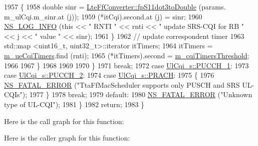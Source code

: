 \begin{DoxyCode}
1957               \{
1958                 \textcolor{keywordtype}{double} sinr = \hyperlink{classns3_1_1LteFfConverter_aa5d8c2a8f988dbd63da91818c18666eb}{LteFfConverter::fpS11dot3toDouble} (params.
      m\_ulCqi.m\_sinr.at (j));
1959                 (*itCqi).second.at (j) = sinr;
1960                 \hyperlink{group__logging_gafbd73ee2cf9f26b319f49086d8e860fb}{NS\_LOG\_INFO} (\textcolor{keyword}{this} << \textcolor{stringliteral}{" RNTI "} << rnti << \textcolor{stringliteral}{" update SRS-CQI for RB  "} << j << \textcolor{stringliteral}{"
       value "} << sinr);
1961               \}
1962             \textcolor{comment}{// update correspondent timer}
1963             std::map <uint16\_t, uint32\_t>::iterator itTimers;
1964             itTimers = \hyperlink{classns3_1_1TtaFfMacScheduler_adb17b15e869d53e4244bf77f3f842f67}{m\_ueCqiTimers}.find (rnti);
1965             (*itTimers).second = \hyperlink{classns3_1_1TtaFfMacScheduler_a3dd8aa322782db3d0f2bbaf9fede6fca}{m\_cqiTimersThreshold};
1966 
1967           \}
1968 
1969 
1970       \}
1971       \textcolor{keywordflow}{break};
1972     \textcolor{keywordflow}{case} \hyperlink{structns3_1_1UlCqi__s_aece9e5ebea42eb9ff1744c72c8459b57a05ca6554bc6fcd96a0a51fbaa8e794c7}{UlCqi\_s::PUCCH\_1}:
1973     \textcolor{keywordflow}{case} \hyperlink{structns3_1_1UlCqi__s_aece9e5ebea42eb9ff1744c72c8459b57a35664b4bda6f1cd6acfe9edc84c7571d}{UlCqi\_s::PUCCH\_2}:
1974     \textcolor{keywordflow}{case} \hyperlink{structns3_1_1UlCqi__s_aece9e5ebea42eb9ff1744c72c8459b57af93f36792cb1eed08f6119e4abfe58e8}{UlCqi\_s::PRACH}:
1975       \{
1976         \hyperlink{group__fatal_ga5131d5e3f75d7d4cbfd706ac456fdc85}{NS\_FATAL\_ERROR} (\textcolor{stringliteral}{"TtaFfMacScheduler supports only PUSCH and SRS UL-CQIs"});
1977       \}
1978       \textcolor{keywordflow}{break};
1979     \textcolor{keywordflow}{default}:
1980       \hyperlink{group__fatal_ga5131d5e3f75d7d4cbfd706ac456fdc85}{NS\_FATAL\_ERROR} (\textcolor{stringliteral}{"Unknown type of UL-CQI"});
1981     \}
1982   \textcolor{keywordflow}{return};
1983 \}
\end{DoxyCode}


Here is the call graph for this function\+:




Here is the caller graph for this function\+:



